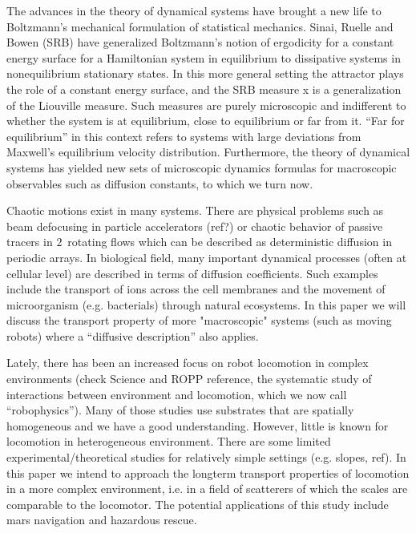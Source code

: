 \documentclass[aps,pre,
                showpacs,
                twocolumn,
                groupedaddress,
                floatfix]{revtex4-1}
\begin{document}

The advances in the theory of dynamical systems have brought a new
life to Boltzmann's mechanical formulation of statistical
mechanics. Sinai, Ruelle and Bowen (SRB) have generalized Boltzmann's
notion of ergodicity for a constant energy surface for a Hamiltonian
system in equilibrium to dissipative systems in {nonequilibrium}
stationary states. In this more general setting the attractor plays
the role of a constant energy surface, and the SRB measure x is a
generalization of the Liouville measure. Such measures are purely
microscopic and indifferent to whether the system is at equilibrium,
close to equilibrium or far from it. ``Far for equilibrium'' in this
context refers to systems with large deviations from Maxwell's
equilibrium velocity distribution. Furthermore, the theory of
dynamical systems has yielded new sets of microscopic dynamics
formulas for macroscopic observables such as diffusion constants, to
which we turn now.

Chaotic motions exist in many systems. There are physical problems
such as beam defocusing in particle accelerators (ref?) or chaotic
behavior of passive tracers in $2$\dmn\ rotating
flows which can be described as
deterministic diffusion in periodic arrays. In biological field, many
important dynamical processes (often at cellular level) are described
in terms of diffusion coefficients. Such examples include the
transport of ions across the cell membranes
and the movement of microorganism (e.g. bacterials) through natural
ecosystems. In this paper we will discuss the
transport property of more "macroscopic" systems (such as moving
robots) where a ``diffusive description'' also
applies.

Lately, there has been an increased focus on robot locomotion in
complex environments (check Science and ROPP reference, the systematic
study of interactions between environment and locomotion, which we now
call ``robophysics''). Many of those studies use substrates that are
spatially homogeneous and we have a good
understanding. However,
little is known for locomotion in heterogeneous environment. There are
some limited experimental/theoretical studies for relatively simple
settings (e.g. slopes, ref). In this paper we intend to approach the
longterm transport properties of locomotion in a more complex
environment, i.e. in a field of scatterers of which the scales are
comparable to the locomotor. The potential applications of this study
include mars navigation and hazardous rescue.
\end{document}
